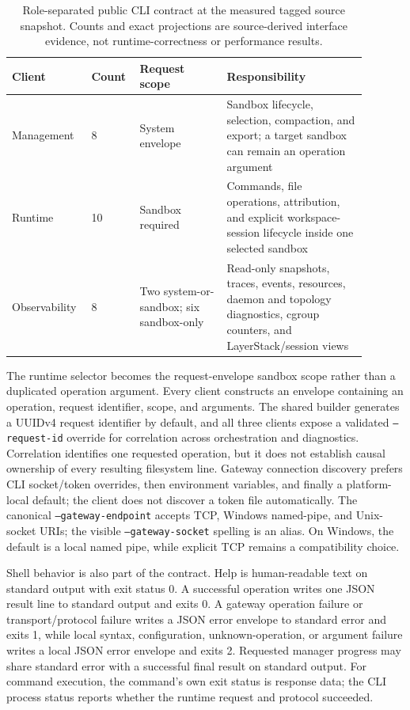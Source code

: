 \begin{table}[H]
\centering
\small
\begin{tabular}{p{0.17\linewidth}p{0.12\linewidth}p{0.23\linewidth}p{0.37\linewidth}}
\hline
Client & Count & Request scope & Responsibility \\
\hline
Management & 8 & System envelope & Sandbox lifecycle, selection, compaction,
and export; a target sandbox can remain an operation argument \\
Runtime & 10 & Sandbox required & Commands, file operations, attribution,
and explicit workspace-session lifecycle inside one selected sandbox \\
Observability & 8 & Two system-or-sandbox; six sandbox-only & Read-only
snapshots, traces, events, resources, daemon and topology diagnostics, cgroup
counters, and LayerStack/session views \\
\hline
\end{tabular}
\caption{Role-separated public CLI contract at the measured tagged source
snapshot. Counts and exact projections are source-derived interface evidence,
not runtime-correctness or performance results.}
\label{tab:cli-roles}
\end{table}

The runtime selector becomes the request-envelope sandbox scope rather than a
duplicated operation argument. Every client constructs an envelope containing
an operation, request identifier, scope, and arguments. The shared builder
generates a UUIDv4 request identifier by default, and all three clients expose
a validated \texttt{--request-id} override for correlation across
orchestration and diagnostics. Correlation identifies one requested operation,
but it does not
establish causal ownership of every resulting filesystem line.  Gateway
connection discovery prefers CLI socket/token overrides, then environment
variables, and finally a platform-local default; the client does not discover
a token file automatically. The canonical \texttt{--gateway-endpoint} accepts
TCP, Windows named-pipe, and Unix-socket URIs; the visible
\texttt{--gateway-socket} spelling is an alias. On Windows, the default is a
local named pipe, while explicit TCP remains a compatibility choice.

Shell behavior is also part of the contract.  Help is human-readable text on
standard output with exit status 0.  A successful operation writes one JSON
result line to standard output and exits 0.  A gateway operation failure or
transport/protocol failure writes a JSON error envelope to standard error and
exits 1, while local syntax, configuration, unknown-operation, or argument
failure writes a local JSON error envelope and exits 2.  Requested manager
progress may share standard error with a successful final result on standard
output.  For command execution, the command's own exit status is response
data; the CLI process status reports whether the runtime request and protocol
succeeded.

